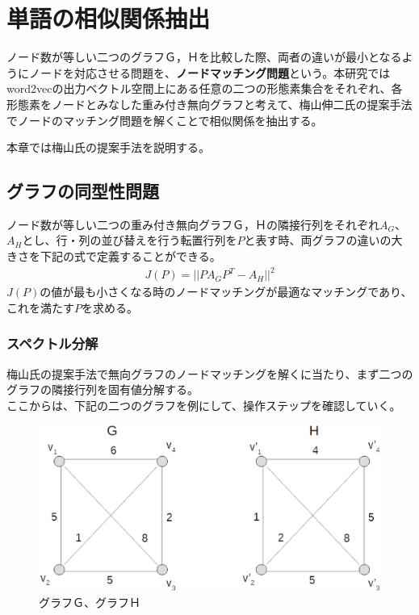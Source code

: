 \chapter{単語の相似関係抽出}
ノード数が等しい二つのグラフＧ，Ｈを比較した際、両者の違いが最小となるようにノードを対応させる問題を、\textbf{ノードマッチング問題}という。本研究ではword2vecの出力ベクトル空間上にある任意の二つの形態素集合をそれぞれ、各形態素をノードとみなした重み付き無向グラフと考えて、梅山伸二氏の提案手法\cite{s_umeyama}でノードのマッチング問題を解くことで相似関係を抽出する。

本章では梅山氏の提案手法を説明する。

\section{グラフの同型性問題}
ノード数が等しい二つの重み付き無向グラフＧ，Ｈの隣接行列をそれぞれ$A_G$、$A_H$とし、行・列の並び替えを行う転置行列を$P$と表す時、両グラフの違いの大きさを下記の式で定義することができる。
\begin{eqnarray}
  J(P) = ||PA_GP^T-A_H||^2
\end{eqnarray}
$J(P)$の値が最も小さくなる時のノードマッチングが最適なマッチングであり、これを満たす$P$を求める。

\subsection{スペクトル分解}
梅山氏の提案手法で無向グラフのノードマッチングを解くに当たり、まず二つのグラフの隣接行列を固有値分解する。\\
ここからは、下記の二つのグラフを例にして、操作ステップを確認していく。
\begin{figure}[h]
  \centering
  \includegraphics[width=12.5cm]{../images/gh.eps}
  \caption{グラフＧ、グラフＨ}
\end{figure}
